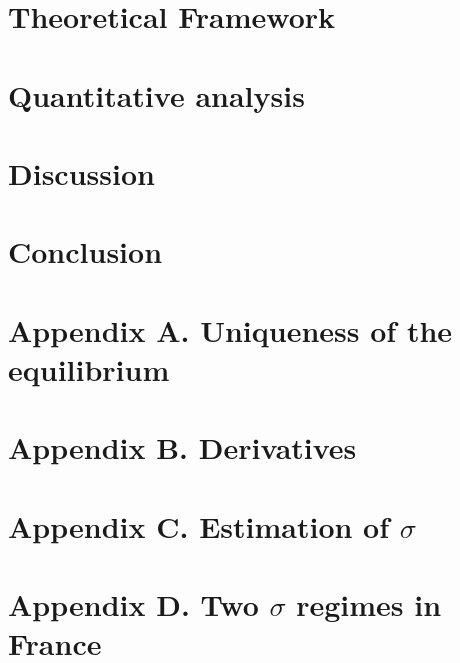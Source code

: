 \documentclass[12pt]{article}
\begin{document}
	\section{Theoretical Framework} \label{sec:model}
	
	
	\section{Quantitative analysis} \label{sec:quantitative_analysis}
	
	
	\section{Discussion} \label{sec:discussion}
	
	
	\section{Conclusion} \label{sec:conclusion}
	
	
	\setlength\bibsep{0pt}
	
	
	
	\clearpage
	\onehalfspacing
	\appendix
	
	\section*{Appendix A. Uniqueness of the equilibrium} \label{appendix:uniqueness}
	
	
	\section*{Appendix B. Derivatives} \label{appendix:derivatives}
	

	\section*{Appendix C. Estimation of $\sigma$} \label{appendix:sigma}
	
	
	\section*{Appendix D. Two $\sigma$ regimes in France} \label{appendix:regime}
	
	
	
\end{document}
